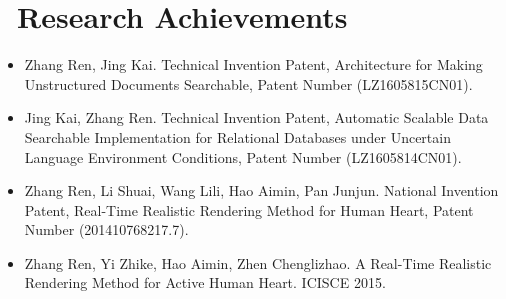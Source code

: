 \documentclass{resume}
\begin{document}
\section{\faInfo\ Research Achievements}
\begin{itemize}[parsep=0.5ex]
\item Zhang Ren, Jing Kai. Technical Invention Patent, Architecture for Making Unstructured Documents Searchable, Patent Number (LZ1605815CN01).
\item Jing Kai, Zhang Ren. Technical Invention Patent, Automatic Scalable Data Searchable Implementation for Relational Databases under Uncertain Language Environment Conditions, Patent Number (LZ1605814CN01).
\item Zhang Ren, Li Shuai, Wang Lili, Hao Aimin, Pan Junjun. National Invention Patent, Real-Time Realistic Rendering Method for Human Heart, Patent Number (201410768217.7).
\item Zhang Ren, Yi Zhike, Hao Aimin, Zhen Chenglizhao. A Real-Time Realistic Rendering Method for Active Human Heart. ICISCE 2015.
\end{itemize}

%
%
\end{document}
